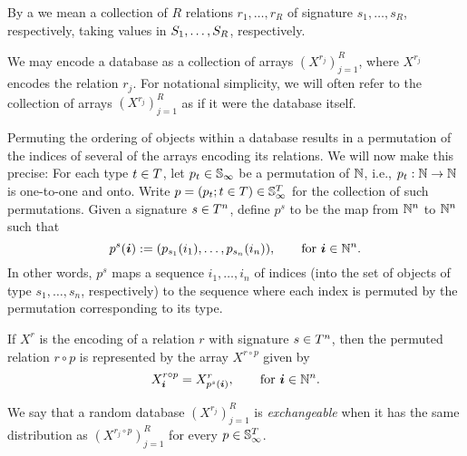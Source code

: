 \begin{definition}[database]
By a  we mean a collection of $R$ relations $r_1,\dotsc,r_R$ of signature $s_1,\dotsc,s_R$, respectively, taking values in $S_1,\dotsc,S_R$, respectively.
\end{definition}

We may encode a database as a collection of arrays $(X^{r_j})_{j=1}^R$, where $X^{r_j}$ encodes the relation $r_j$.  
For notational simplicity, we will often refer to the collection of arrays $(X^{r_j})_{j=1}^R$ as if it were the database itself.

Permuting the ordering of objects within a database results in a permutation of the indices of several of the arrays encoding its relations.  We will now make this precise:
For each type $t \in T$, let $p_t \in \mathbb{S}_{\infty}$ be a permutation of $\mathbb{N}$, i.e., $p_t : \mathbb{N} \to \mathbb{N}$ is one-to-one and onto.  
Write $p = (p_t ; t \in T) \in \mathbb{S}_{\infty}^T$ for the collection of such permutations.
Given a signature $s \in T^n$, define $p^s$ to be the map from $\mathbb{N}^n$ to $\mathbb{N}^n$ such that
\[
p^s(\bm{i}) := (p_{s_1}(i_1), \dotsc,p_{s_n}(i_n)), \qquad \text{for } \bm{i} \in \mathbb{N}^n.
\]
In other words, $p^s$ maps a sequence $i_1,\dotsc,i_n$ of indices (into the set of objects of type $s_1,\dotsc,s_n$, respectively) to the sequence where each index is permuted by the permutation corresponding to its type.

If $X^r$ is the encoding of a relation $r$ with signature $s \in T^n$, then the permuted relation $r \circ p$ is represented by the array $X^{r\circ p}$ given by
\[
X^{r \circ p}_{\bm{i}} = X^r_{p^s(\bm{i})}, \qquad \text{for } \bm{i} \in \mathbb{N}^n.
\]


\begin{definition}
We say that a random database $(X^{r_j})_{j=1}^R$ is \emph{exchangeable} when it has the same distribution as $(X^{r_j\circ p})_{j=1}^R$ for every $p \in \mathbb{S}_{\infty}^T$.
\end{definition}



